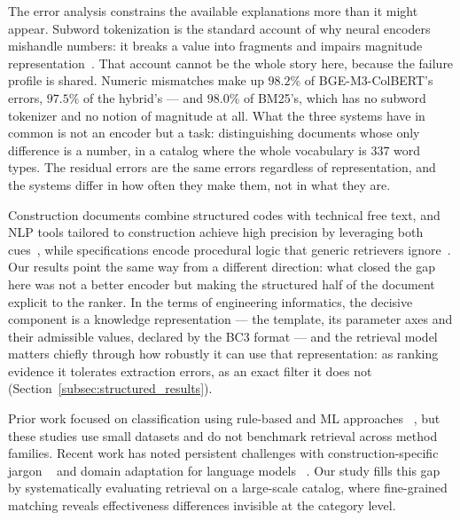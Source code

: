\documentclass[preprint,review,12pt]{elsarticle}
\begin{document}
The error analysis constrains the available explanations more than it might appear. Subword tokenization is the standard account of why neural encoders mishandle numbers: it breaks a value into fragments and impairs magnitude representation~\cite{wallace2019nlp}. That account cannot be the whole story here, because the failure profile is shared. Numeric mismatches make up $98.2\%$ of BGE-M3-ColBERT's errors, $97.5\%$ of the hybrid's --- and $98.0\%$ of BM25's, which has no subword tokenizer and no notion of magnitude at all. What the three systems have in common is not an encoder but a task: distinguishing documents whose only difference is a number, in a catalog where the whole vocabulary is $337$ word types. The residual errors are the same errors regardless of representation, and the systems differ in how often they make them, not in what they are.

Construction documents combine structured codes with technical free text, and NLP tools tailored to construction achieve high precision by leveraging both cues~\cite{AKANBI2021}, while specifications encode procedural logic that generic retrievers ignore~\cite{LI2023}. Our results point the same way from a different direction: what closed the gap here was not a better encoder but making the structured half of the document explicit to the ranker. In the terms of engineering informatics, the decisive component is a knowledge representation --- the template, its parameter axes and their admissible values, declared by the BC3 format --- and the retrieval model matters chiefly through how robustly it can use that representation: as ranking evidence it tolerates extraction errors, as an exact filter it does not (Section~\ref{subsec:structured_results}).

Prior work focused on classification using rule-based and ML approaches ~\cite{caldasAutomatingHierarchicalDocument2003, wuNaturalLanguageProcessing2022, martinez-rojasApproachAutomaticClassification2015, role_martnezrojas_2016, martinez-rojasUsingClassificationTechniques2018}, but these studies use small datasets and do not benchmark retrieval across method families. Recent work has noted persistent challenges with construction-specific jargon ~\cite{wuNaturalLanguageProcessing2022} and domain adaptation for language models ~\cite{chungComparingNaturalLanguage2023}. Our study fills this gap by systematically evaluating retrieval on a large-scale catalog, where fine-grained matching reveals effectiveness differences invisible at the category level.
\end{document}
